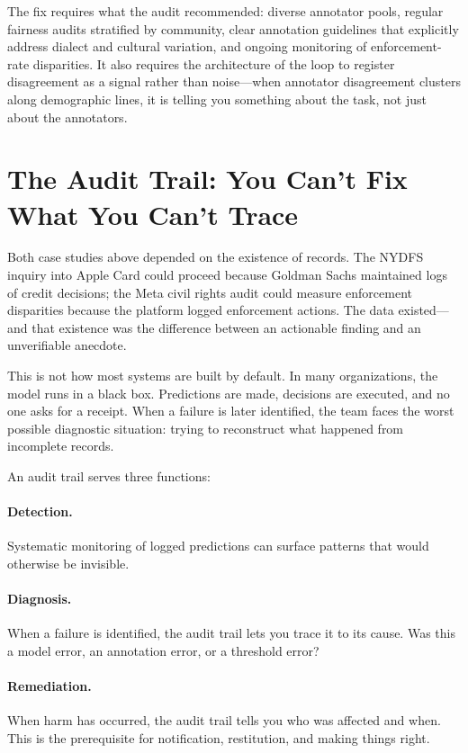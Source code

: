 The fix requires what the audit recommended: diverse annotator pools, regular fairness audits stratified by community, clear annotation guidelines that explicitly address dialect and cultural variation, and ongoing monitoring of enforcement-rate disparities. It also requires the architecture of the loop to register disagreement as a signal rather than noise---when annotator disagreement clusters along demographic lines, it is telling you something about the task, not just about the annotators.

\section{The Audit Trail: You Can't Fix What You Can't Trace}
\label{sec:audit-trail}

Both case studies above depended on the existence of records. The NYDFS inquiry into Apple Card could proceed because Goldman Sachs maintained logs of credit decisions; the Meta civil rights audit could measure enforcement disparities because the platform logged enforcement actions. The data existed---and that existence was the difference between an actionable finding and an unverifiable anecdote.

This is not how most \hitl systems are built by default. In many organizations, the model runs in a black box. Predictions are made, decisions are executed, and no one asks for a receipt. When a failure is later identified, the team faces the worst possible diagnostic situation: trying to reconstruct what happened from incomplete records.

An audit trail serves three functions:

\paragraph{Detection.} Systematic monitoring of logged predictions can surface patterns that would otherwise be invisible.

\paragraph{Diagnosis.} When a failure is identified, the audit trail lets you trace it to its cause. Was this a model error, an annotation error, or a threshold error?

\paragraph{Remediation.} When harm has occurred, the audit trail tells you who was affected and when. This is the prerequisite for notification, restitution, and making things right.

